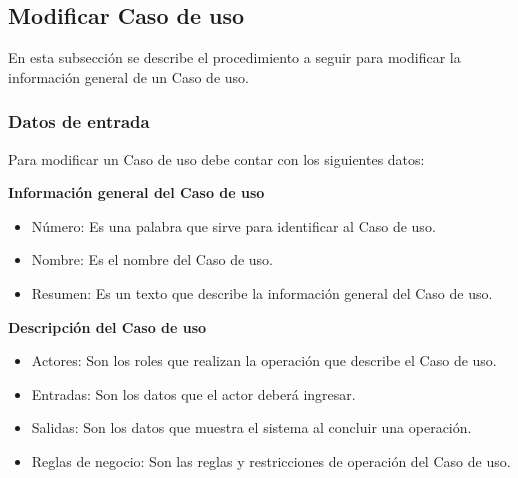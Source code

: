 \subsection{Modificar Caso de uso}
En esta subsección se describe el procedimiento a seguir para modificar la información general de un Caso de uso.

\subsubsection{Datos de entrada}
\begin{description}
	\item Para modificar un Caso de uso debe contar con los siguientes datos: \hspace{10pt}
	\begin{description}
	    \item \textbf{Información general del Caso de uso}
	    \begin{itemize}
		  \item Número: Es una palabra que sirve para identificar al Caso de uso.
		  \item Nombre: Es el nombre del Caso de uso.
		  \item Resumen: Es un texto que describe la información general del Caso de uso.
	    \end{itemize}
	    \item \textbf{Descripción del Caso de uso}
	    \begin{itemize}
		  \item Actores: Son los roles que realizan la operación que describe el Caso de uso.
		  \item Entradas: Son los datos que el actor deberá ingresar.
		  \item Salidas: Son los datos que muestra el sistema al concluir una operación.
		  \item Reglas de negocio: Son las reglas y restricciones de operación del Caso de uso.
	    \end{itemize}
	 \end{description}
\end{description}

